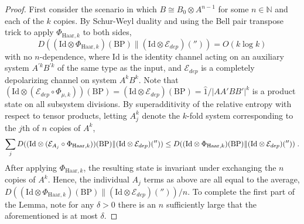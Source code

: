 \documentclass[11pt,reqno]{amsart}
\newcommand{\NN}{\mathbb{N}}
\newcommand{\E}{\mathcal{E}}
\newcommand{\id}{\hat{1}}
\newcommand{\Id}{\mathrm{Id}}
\newcommand{\pl}{\hspace{.1cm}}
\begin{document}
\begin{proof}
    First consider the scenario in which $B \cong B_0 \otimes A^{n-1}$ for some $n \in \NN$ and each of the $k$ copies. By Schur-Weyl duality and using the Bell pair transpose trick to apply $\Phi_{\mathrm{Haar},k}$ to both sides,
    \begin{equation}
        D((\Id \otimes \Phi_{\mathrm{Haar},k}) (\mathrm{BP}) \| (\Id \otimes \E_{dep})('')) = O(k \log k)
    \end{equation}
    with no $n$-dependence, where $\Id$ is the identity channel acting on an auxiliary system $A^{'k} B^{'k}$ of the same type as the input, and $\E_{dep}$ is a completely depolarizing channel on system $A^k B^k$. Note that $(\Id \otimes (\E_{dep} \circ \Phi_{\mu,k}))(\mathrm{BP}) = (\Id \otimes \E_{dep})(\mathrm{BP}) = \id / |A A' B B'|^k$ is a product state on all subsystem divisions. By superadditivity of the relative entropy with respect to tensor products, letting $A_j^k$ denote the $k$-fold system corresponding to the $j$th of $n$ copies of $A^k$,
    \begin{equation}
        \sum_j D((\Id \otimes (\E_{A_j} \circ \Phi_{\mathrm{Haar},k})) (\mathrm{BP}) \| (\Id \otimes \E_{dep})('')) 
            \leq D((\Id \otimes \Phi_{\mathrm{Haar},k}) (\mathrm{BP}) \| (\Id \otimes \E_{dep})('')) \pl.
    \end{equation}
    After applying $\Phi_{\mathrm{Haar}, k}$, the resulting state is invariant under exchanging the $n$ copies of $A^k$. Hence, the individual $A_j$ terms as above are all equal to the average, $D((\Id \otimes \Phi_{\mathrm{Haar},k}) (\mathrm{BP}) \| (\Id \otimes \E_{dep})('')) / n$. To complete the first part of the Lemma, note for any $\delta > 0$ there is an $n$ sufficiently large that the aforementioned is at most $\delta$.


\end{proof}
\end{document}
